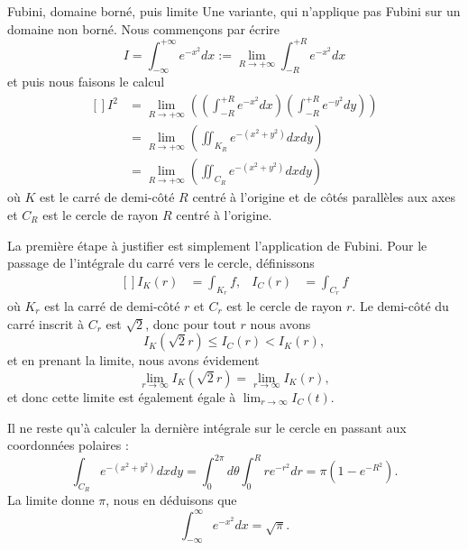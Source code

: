 \begin{example}
\begin{subproof}
        \item[Fubini, domaine borné, puis limite]
    Une variante, qui n'applique pas Fubini sur un domaine non borné. Nous commençons par écrire
\begin{equation}
	I=\int_{-\infty}^{+\infty} e^{-x^2} dx := \lim_{R \to +\infty} \int_{-R}^{+R} e^{-x^2} dx
\end{equation}
et puis nous faisons le calcul
\begin{equation}		\label{EqCalculInteeemoisxcar}
	\begin{aligned}[]
		I^2 &= \lim_{R \to +\infty} \left( (\int_{-R}^{+R} e^{-x^2} dx)( \int_{-R}^{+R} e^{-y^2} dy) \right) \\
		&= \lim_{R \to +\infty} \left( \iint_{K_R}e^{-(x^2+y^2)} dx dy \right) \\
		&= \lim_{R \to +\infty} \left( \iint_{C_R}e^{-(x^2+y^2)} dx dy \right)
	\end{aligned}
\end{equation}
où $K$ est le carré de demi-côté $R$ centré à l'origine et de côtés parallèles aux axes et $C_R$ est le cercle de rayon $R$ centré à l'origine.

	La première étape à justifier est simplement l'application de Fubini. Pour le passage de l'intégrale du carré vers le cercle, définissons
	\begin{equation}
		\begin{aligned}[]
			I_K(r)&=\int_{K_r}f,&I_C(r)&=\int_{C_r}f
		\end{aligned}
	\end{equation}
	où $K_r$ est la carré de demi-côté $r$ et $C_r$ est le cercle de rayon $r$. Le demi-côté du carré inscrit à $C_r$ est $\sqrt{2}$, donc pour tout $r$ nous avons
	\begin{equation}
		I_K(\sqrt{2}r)\leq I_C(r)<I_K(r),
	\end{equation}
	et en prenant la limite, nous avons évidement
	\begin{equation}
		\lim_{r\to \infty}I_K(\sqrt{2}r)=\lim_{r\to\infty}I_K(r),
	\end{equation}
	et donc cette limite est également égale à $\lim_{r\to\infty}I_C(t)$.

    Il ne reste qu'à calculer la dernière intégrale sur le cercle en passant aux coordonnées polaires :
	\begin{equation}
        \int_{C_R} e^{-(x^2+y^2)}dxdy=\int_0^{2\pi}d\theta\int_0^Rr e^{-r^2}dr=\pi(1- e^{-R^2}).
	\end{equation}
	La limite donne $\pi$, nous en déduisons que
    \begin{equation}    \label{EqFDvHTg}
		\int_{-\infty}^{\infty} e^{-x^2}dx=\sqrt{\pi}.
	\end{equation}
    \end{subproof}

\end{example}

